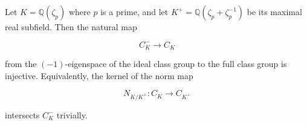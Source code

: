 Let $K = \mathbb{Q}(\zeta_{p})$ where $p$ is a prime, and let $K^+ = \mathbb{Q}(\zeta_p + \zeta_p^{-1})$ be its maximal real subfield. Then the natural map

$$
C_K^- \longrightarrow C_K
$$

from the $(-1)$-eigenspace of the ideal class group to the full class group is injective. Equivalently, the kernel of the norm map

$$
N_{K/K^+}: C_K \longrightarrow C_{K^+}
$$

intersects $C_K^-$ trivially.
